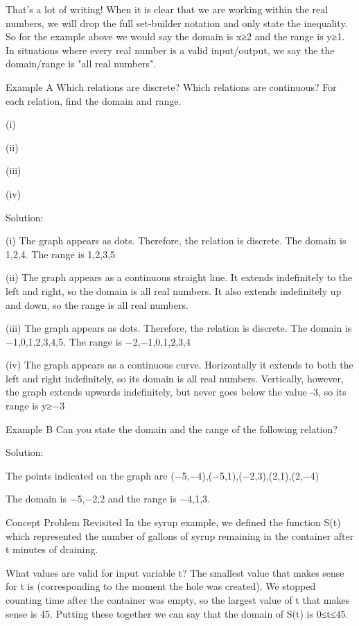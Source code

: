 \documentclass{ximera}
\begin{document}
 

That's a lot of writing! When it is clear that we are working within the real numbers, we will drop the full set-builder notation and only state the inequality. So for the example above we would say the domain is x≥2 and the range is y≥1. In situations where every real number is a valid input/output, we say the the domain/range is "all real numbers".

Example A
Which relations are discrete? Which relations are continuous? For each relation, find the domain and range.

(i)   

(ii)   

(iii)   

(iv)   

Solution:

(i) The graph appears as dots. Therefore, the relation is discrete. The domain is {1,2,4}. The range is {1,2,3,5}

(ii) The graph appears as a continuous straight line. It extends indefinitely to the left and right, so the domain is all real numbers. It also extends indefinitely up and down, so the range is all real numbers.

(iii) The graph appears as dots. Therefore, the relation is discrete. The domain is {−1,0,1,2,3,4,5}. The range is {−2,−1,0,1,2,3,4}

(iv) The graph appears as a continuous curve. Horizontally it extends to both the left and right indefinitely, so its domain is all real numbers. Vertically, however, the graph extends upwards indefinitely, but never goes below the value -3, so its range is y≥−3 

Example B
Can you state the domain and the range of the following relation?

 

Solution:

The points indicated on the graph are {(−5,−4),(−5,1),(−2,3),(2,1),(2,−4)}

The domain is {−5,−2,2} and the range is {−4,1,3}.

Concept Problem Revisited
In the syrup example, we defined the function S(t) which represented the number of gallons of syrup remaining in the container after t minutes of draining.

What values are valid for input variable t? The smallest value that makes sense for t is  (corresponding to the moment the hole was created). We stopped counting time after the container was empty, so the largest value of t that makes sense is 45. Putting these together we can say that the domain of S(t) is 0≤t≤45.
\end{document}
